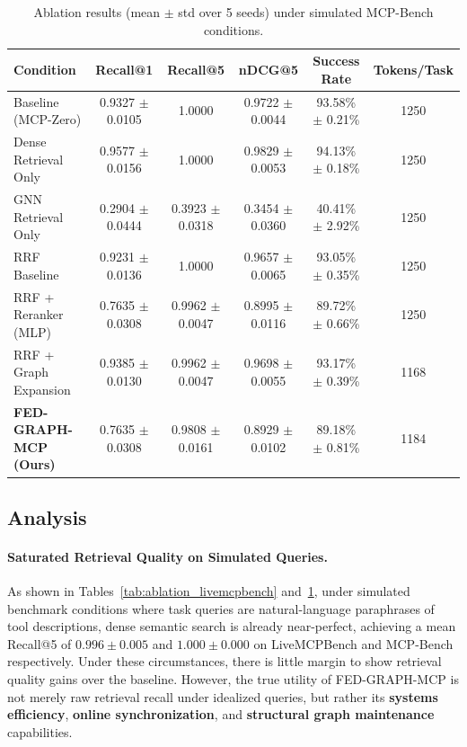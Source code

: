 \documentclass[conference]{IEEEtran}
\begin{document}
\begin{table}[htbp]
\centering
\caption{Ablation results (mean $\pm$ std over 5 seeds) under simulated MCP-Bench conditions.\protect\footnotemark}
\label{tab:ablation_mcp_bench}
\begin{tabular}{lccccc}
\hline
Condition & Recall@1 & Recall@5 & nDCG@5 & Success Rate & Tokens/Task \\
\hline
Baseline (MCP-Zero) & 0.9327 $\pm$ 0.0105 & 1.0000 & 0.9722 $\pm$ 0.0044 & 93.58\% $\pm$ 0.21\% & 1250 \\
Dense Retrieval Only & 0.9577 $\pm$ 0.0156 & 1.0000 & 0.9829 $\pm$ 0.0053 & 94.13\% $\pm$ 0.18\% & 1250 \\
GNN Retrieval Only & 0.2904 $\pm$ 0.0444 & 0.3923 $\pm$ 0.0318 & 0.3454 $\pm$ 0.0360 & 40.41\% $\pm$ 2.92\% & 1250 \\
RRF Baseline & 0.9231 $\pm$ 0.0136 & 1.0000 & 0.9657 $\pm$ 0.0065 & 93.05\% $\pm$ 0.35\% & 1250 \\
RRF + Reranker (MLP) & 0.7635 $\pm$ 0.0308 & 0.9962 $\pm$ 0.0047 & 0.8995 $\pm$ 0.0116 & 89.72\% $\pm$ 0.66\% & 1250 \\
RRF + Graph Expansion & 0.9385 $\pm$ 0.0130 & 0.9962 $\pm$ 0.0047 & 0.9698 $\pm$ 0.0055 & 93.17\% $\pm$ 0.39\% & 1168 \\
\textbf{FED-GRAPH-MCP (Ours)} & 0.7635 $\pm$ 0.0308 & 0.9808 $\pm$ 0.0161 & 0.8929 $\pm$ 0.0102 & 89.18\% $\pm$ 0.81\% & 1184 \\
\hline
\end{tabular}
\end{table}

\subsection{Analysis}

\paragraph{Saturated Retrieval Quality on Simulated Queries.}
As shown in Tables~\ref{tab:ablation_livemcpbench} and~\ref{tab:ablation_mcp_bench}, under simulated benchmark conditions where task queries are natural-language paraphrases of tool descriptions, dense semantic search is already near-perfect, achieving a mean Recall@5 of $0.996 \pm 0.005$ and $1.000 \pm 0.000$ on LiveMCPBench and MCP-Bench respectively. Under these circumstances, there is little margin to show retrieval quality gains over the baseline. However, the true utility of FED-GRAPH-MCP is not merely raw retrieval recall under idealized queries, but rather its \textbf{systems efficiency}, \textbf{online synchronization}, and \textbf{structural graph maintenance} capabilities.
\end{document}
